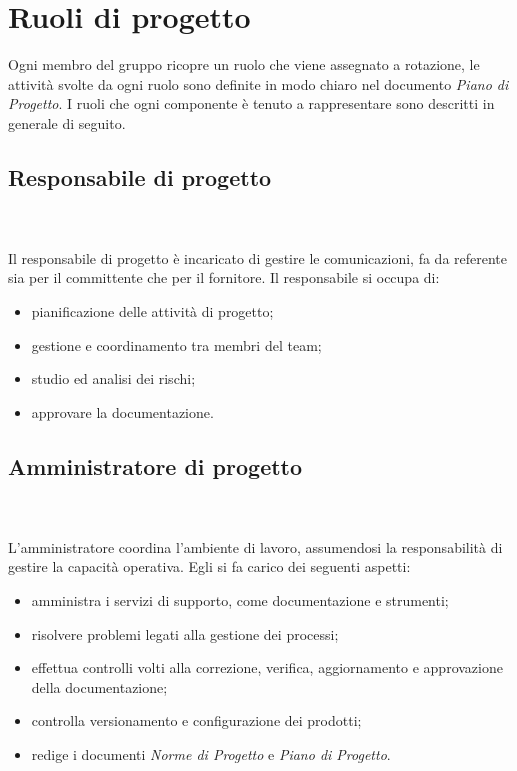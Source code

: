 
		\section{Ruoli di progetto}%
		Ogni membro del gruppo ricopre un ruolo che viene assegnato a rotazione, le attività svolte da ogni ruolo sono definite in modo chiaro nel documento \textit{Piano di Progetto}.
		I ruoli che ogni componente è tenuto a rappresentare sono descritti in generale di seguito.
			\subsection{Responsabile di progetto} \mbox{}\\ \mbox{}\\
			Il responsabile di progetto è incaricato di gestire le comunicazioni, fa da referente sia per il committente che per il fornitore.\newline
			Il responsabile si occupa di:
			\begin{itemize}
				\item pianificazione delle attività di progetto;
				\item  gestione e coordinamento tra membri del team;
				\item studio ed analisi dei rischi;
				\item approvare la documentazione.
			\end{itemize}
			\subsection{Amministratore di progetto} \mbox{}\\ \mbox{}\\
			L'amministratore coordina l'ambiente di lavoro, assumendosi la responsabilità di gestire la capacità operativa.\newline
			Egli si fa carico dei seguenti aspetti:
			\begin{itemize}
				\item amministra i servizi di supporto, come documentazione e strumenti;
				\item risolvere problemi legati alla gestione dei processi;
				\item effettua controlli volti alla correzione, verifica, aggiornamento e approvazione della documentazione;
				\item controlla versionamento e configurazione dei prodotti;
				\item redige i documenti \textit{Norme di Progetto} e \textit{Piano di Progetto}.
			\end{itemize}
